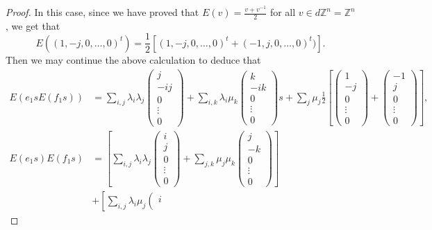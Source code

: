 \documentclass[12pt]{amsart}
\theoremstyle{definition}
\theoremstyle{remark}
\begin{document}
\begin{proof}
In this case, since we have proved that $E(v)=\frac{v+v^{-1}}{2}$ for all $v\in d\mathbb{Z}^n=\mathbb{Z}^n$, we get that $$E((1,-j,0,\ldots,0)^t)=\frac{1}{2}\left[(1,-j,0,\ldots,0)^t+(-1,j,0,\ldots,0)^t)\right].$$ 
Then we may continue the above calculation to deduce that 
\begin{align*}
E(e_1sE(f_1s))&=\sum_{i,j}\lambda_i\lambda_j\left(\begin{smallmatrix}
j\\
-ij\\
0\\
\vdots\\
0
\end{smallmatrix}\right)+\sum_{i, k}\lambda_i\mu_k\left(\begin{smallmatrix}
k\\
-ik\\
0\\
\vdots\\
0
\end{smallmatrix}\right)s+\sum_j\mu_j\frac{1}{2}\left[\left(\begin{smallmatrix}
1\\
-j\\
0\\
\vdots\\
0
\end{smallmatrix}\right)+\left(\begin{smallmatrix}
-1\\
j\\
0\\
\vdots\\
0
\end{smallmatrix}\right)\right],\\
E(e_1s)E(f_1s)&=\left[\sum_{i, j}\lambda_i\lambda_j\left(\begin{smallmatrix}
i\\
j\\
0\\
\vdots\\
0
\end{smallmatrix}\right)+\sum_{j, k}\mu_j\mu_k\left(\begin{smallmatrix}
j\\
-k\\
0\\
\vdots\\
0
\end{smallmatrix}\right)\right]\\
&+\left[\sum_{i,j}\lambda_i\mu_j\left(\begin{smallmatrix}
i\\

\end{smallmatrix}
\end{align*}
\end{proof}
\end{document}
